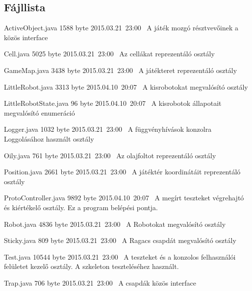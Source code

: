\subsection{Fájllista}

\begin{fajllista}

\fajl
{ActiveObject.java} %
{1588 byte} %
{2015.03.21~23:00~} %
{A játék mozgó résztvevőinek a közös interface} %

\fajl
{Cell.java} %
{5025 byte} %
{2015.03.21~23:00~} %
{Az cellákat reprezentáló osztály} %

\fajl
{GameMap.java} %
{3438 byte} %
{2015.03.21~23:00~} %
{A játékteret reprezentáló osztály} %

\fajl
{LittleRobot.java}
{3313 byte}
{2015.04.10~20:07~}
{A kisrobotokat megvalósító osztály}

\fajl
{LittleRobotState.java}
{96 byte}
{2015.04.10~20:07~}
{A kisrobotok állapotait megvalósító enumeráció}

\fajl
{Logger.java} %
{1032 byte} %
{2015.03.21~23:00~} %
{A függvényhívások konzolra Loggolásához használt osztály} %

\fajl
{Oily.java} %
{761 byte} %
{2015.03.21~23:00~} %
{Az olajfoltot reprezentáló osztály} %

\fajl
{Position.java} %
{2661 byte} %
{2015.03.21~23:00~} %
{A játéktér koordinátáit reprezentáló osztály} %

\fajl
{ProtoController.java}
{9892 byte}
{2015.04.10~20:07~}
{A megírt teszteket végrehajtó és kiértékelő osztály. Ez a program belépési pontja.}

\fajl
{Robot.java} %
{4836 byte} %
{2015.03.21~23:00~} %
{A Robotokat megvalósító osztály} %

\fajl
{Sticky.java} %
{809 byte} %
{2015.03.21~23:00~} %
{A Ragacs csapdát megvalósító osztály} %

\fajl
{Test.java} %
{10544 byte} %
{2015.03.21~23:00~} %
{A teszteket és a konzolos felhasználói felületet kezelő osztály. A szkeleton teszteléséhez használt.} %

\fajl
{Trap.java} %
{706 byte} %
{2015.03.21~23:00~} %
{A csapdák közös interface} %

\end{fajllista}

